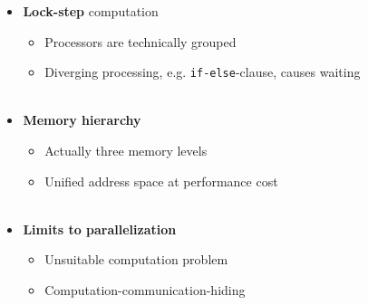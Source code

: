 \documentclass[aspectratio=1610]{beamer}
\begin{document}
\begin{frame}
\begin{columns}
\begin{column}{0.28\textwidth}
\begin{figure}
            \end{figure}
        \end{column}
        \begin{column}{0.48\textwidth}
            \begin{itemize}
                \item \textbf{Lock-step} computation
                \begin{itemize}
                    \item Processors are technically grouped
                    \item Diverging processing, e.g. \texttt{if-else}-clause, causes waiting\\~
                \end{itemize}
                \item \textbf{Memory hierarchy}
                \begin{itemize}
                    \item Actually three memory levels
                    \item Unified address space at performance cost\\~
                \end{itemize}
                \item \textbf{Limits to parallelization}
                \begin{itemize}
                    \item Unsuitable computation problem
                    \item Computation-communication-hiding
                \end{itemize}
            \end{itemize}
        \end{column}
    \end{columns}
\end{frame}
\end{document}
